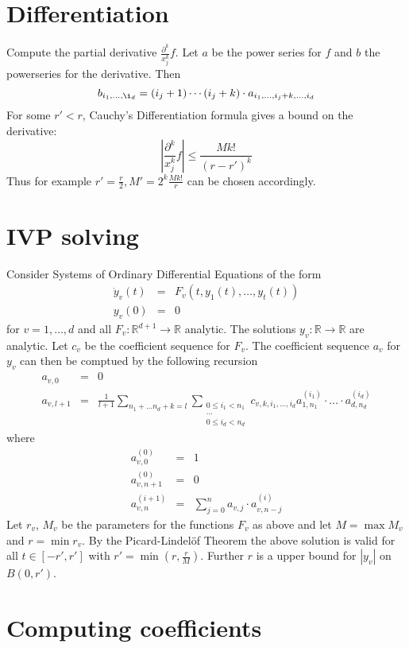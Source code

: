 \documentclass[]{article}
\newcommand{\RR}{\mathbb R}
\newcommand{\abs}[1]{\left|#1\right|}
\begin{document}
\section{Differentiation}
Compute the partial derivative $\frac{\partial^k}{x_j^k}f$.
Let $a$ be the power series for $f$ and $b$ the powerseries for the derivative.
Then
$$ b_{i_1,\dots, \i_d} = (i_j+1) \cdots (i_j+k) \cdot a_{i_1, \dots, i_j+k, \dots, i_d} $$
For some $r' < r$, Cauchy's Differentiation formula gives a bound on the derivative:
$$\abs{\frac{\partial^k}{x_j^k}f} \leq \frac{Mk!}{(r-r')^k}$$
Thus for example $r'=\frac{r}{2}, M'=2^k\frac{Mk!}{r}$ can be chosen accordingly.
\section{IVP solving}
Consider Systems of Ordinary Differential Equations of the form
\begin{eqnarray*}
  \dot y_v(t) &=& F_v(t, y_1(t), \dots, y_t(t)) \\
  y_v(0) &=& 0 
\end{eqnarray*}
for $v=1,\dots,d$ and all $F_v : \RR^{d+1} \to \RR$ analytic.
The solutions $y_v : \RR \to \RR$ are analytic.
Let $c_v$ be the coefficient sequence for $F_v$.
The coefficient sequence $a_v$ for $y_v$ can then be comptued by the following recursion
\begin{eqnarray*}
  a_{v,0} &=& 0 \\
  a_{v, l+1} &=& \frac{1}{l+1} \sum_{n_1+\dots n_d + k = l} \sum_{\substack {0 \leq i_1 < n_1 \\ \dots\\ 0 \leq i_d < n_d}} c_{v,k,i_1,\dots,i_d} a_{1,n_1}^{(i_1)}\cdot \dots \cdot a_{d, n_d}^{(i_d)}
\end{eqnarray*}
where
\begin{eqnarray*}
 a^{(0)}_{v,0} & = & 1 \\
 a^{(0)}_{v,n+1} & = & 0 \\
 a^{(i+1)}_{v,n} & = & \sum_{j=0}^n a_{v,j} \cdot a_{v, n-j}^{(i)}
\end{eqnarray*}
Let $r_v$, $M_v$ be the parameters for the functions $F_v$ as above and let $M = \max M_v$ and $r = \min r_v$.
By the Picard-Lindel\"{o}f Theorem the above solution is valid for all $t \in [-r', r']$ with $r' = \min(r, \frac{r}{M})$.
Further $r$ is a upper bound for $\abs{y_v}$ on $B(0, r')$. 
\section{Computing coefficients}
\end{document}
